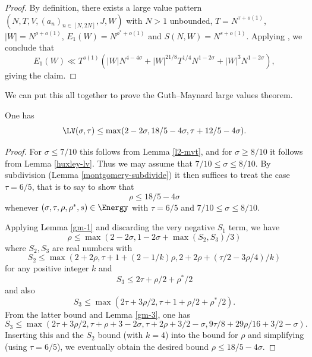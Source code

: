 \literature
{}

\begin{proof} By definition, there exists a large value pattern $(N,T,V,(a_n)_{n \in [N,2N]},J,W)$ with $N>1$ unbounded, $T = N^{\tau+o(1)}$, $|W| = N^{\rho+o(1)}$, $E_1(W) = N^{\rho^*+o(1)}$ and $S(N,W) = N^{s+o(1)}$.  Applying \cite[Proposition 11.1]{guth-maynard}, we conclude that
    $$ E_1(W) \ll T^{o(1)} ( |W| N^{4-4\sigma} + |W|^{21/8} T^{1/4} N^{1-2\sigma} + |W|^3 N^{1-2\sigma} ),$$
giving the claim.
\end{proof}

We can put this all together to prove the Guth--Maynard large values theorem.

\begin{theorem}\label{guth-maynard-lvt}\cite[Theorem~1.1]{guth-maynard} One has
    $$ \LV(\sigma,\tau) \leq \max(2-2\sigma, 18/5 - 4 \sigma, \tau + 12/5 - 4\sigma).$$
\end{theorem}

\literature
{}
\derived
{}

\begin{proof} For $\sigma \leq 7/10$ this follows from Lemma \ref{l2-mvt}, and for $\sigma \geq 8/10$ it follows from Lemma \ref{huxley-lv}.  Thus we may assume that $7/10 \leq \sigma \leq 8/10$.  By subdivision (Lemma \ref{montgomery-subdivide}) it then suffices to treat the case $\tau = 6/5$, that is to say to show that
    $$ \rho \leq 18/5-4\sigma$$
whenever $(\sigma,\tau,\rho,\rho^*,s) \in \Energy$ with $\tau=6/5$ and $7/10 \leq \sigma \leq 8/10$.

Applying Lemma \ref{gm-1} and discarding the very negative $S_1$ term, we have
$$ \rho \leq \max(2-2\sigma, 1-2\sigma + \max(S_2, S_3)/3)$$
where $S_2, S_3$ are real numbers with
$$ S_2 \leq \max(2+2\rho, \tau+1+(2-1/k) \rho, 2 + 2\rho + (\tau/2 - 3\rho/4)/k )$$
for any positive integer $k$ and
$$ S_3 \leq 2\tau + \rho/2 + \rho^*/2$$
and also
$$ S_3 \leq \max( 2\tau + 3\rho/2, \tau+1+\rho/2+\rho^*/2).$$
From the latter bound and Lemma \ref{gm-3}, one has
$$ S_3 \leq \max( 2\tau+3\rho/2, \tau+\rho+3-2\sigma, \tau+2\rho+3/2-\sigma, 9\tau/8+29\rho/16 + 3/2-\sigma).$$
Inserting this and the $S_2$ bound (with $k=4$) into the bound for $\rho$ and simplifying (using $\tau=6/5$), we eventually obtain
the desired bound $\rho \leq 18/5-4\sigma$.
\end{proof}

